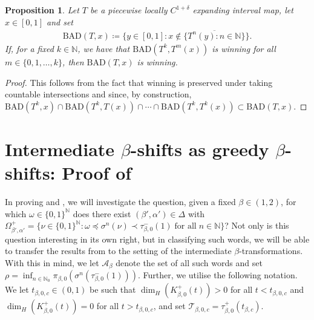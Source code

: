 \documentclass[a4paper,reqno,10pt]{amsart}
\newtheorem{proposition}[theorem]{Proposition}
\begin{document}
    \begin{proposition}\label{prop:alpha-winning_transport}
        Let $T$ be a piecewise locally $C^{1+\delta}$ expanding interval map, let $x \in [0, 1]$ and set
            \begin{align*}
                \mathrm{BAD}(T,x) \coloneqq \{ y \in [0,1] \colon x \not\in \overline{\{T^{n}(y) \colon n \in \mathbb{N}\}}\}.
            \end{align*}
        If, for a fixed $k \in \mathbb{N}$, we have that $\mathrm{BAD}(T^k, T^m(x))$ is winning for all $m \in \{ 0, 1, \ldots, k\}$, then $\mathrm{BAD}(T,x)$ is winning.
    \end{proposition}

\begin{proof}
This follows from the fact that winning is preserved under taking countable intersections and since, by construction, $\mathrm{BAD}(T^k,x)\cap \mathrm{BAD}(T^k,T(x))\cap \cdots \cap \mathrm{BAD}(T^k,T^k(x))\subset \mathrm{BAD}(T,x)$.
\end{proof}

%
%
%
\section{Intermediate \texorpdfstring{$\beta$}{beta}-shifts as greedy \texorpdfstring{$\beta$}{beta}-shifts: Proof of \texorpdfstring{}{Theorem 1.1}}\label{sec:proof_thm_1_1}
%
%
%

In proving  and , we will investigate the question, given a fixed $\beta \in (1, 2)$, for which $\omega \in \{0,1\}^\mathbb{N}$ does there exist $(\beta', \alpha') \in \Delta$ with $\Omega^+_{\beta', \alpha'} = \{ \nu \in \{0,1\}^\mathbb{N} \colon \omega \preceq \sigma^{n}(\nu) \prec \tau_{\beta,0}^{-}(1) \; \text{for all} \; n \in \mathbb{N} \}$? Not only is this question interesting in its own right, but in classifying such words, we will be able to transfer the results from \cite{KKLL} to the setting of the intermediate $\beta$-transformations. With this in mind, we let $\mathcal{A}_\beta$ denote the set of all such words and set $\rho = \inf_{n \in \mathbb{N}_{0}} \pi_{\beta,0}(\sigma^{n}(\tau_{\beta,0}^{-}(1)))$. Further, we utilise the following notation. We let $t_{\beta, 0, c} \in (0,1)$ be such that $\dim_H(K^{+}_{\beta,0}(t))>0$ for all $t < t_{\beta, 0, c}$ and $\dim_H(K^{+}_{\beta, 0}(t)) = 0$ for all $t > t_{\beta, 0, c}$, and set $\mathcal{T}_{\beta, 0, c} = \tau_{\beta,0}^{+}(t_{\beta, c})$.
\end{document}
